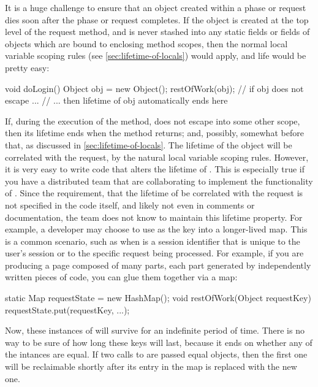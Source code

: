 It is a huge challenge to ensure that an object created within a phase or request
dies soon after the phase or request completes. If the object is created at the
top level of the request method, and is never stashed into any static fields or
fields of objects which are bound to enclosing method scopes, then the normal
local variable scoping rules (see \autoref{sec:lifetime-of-locals}) would apply,
and life would be pretty easy:
\begin{shortlisting}
void doLogin() {
   Object obj = new Object();
   restOfWork(obj); // if obj does not escape ...
} // ... then lifetime of obj automatically ends here
\end{shortlisting}
If, during the execution of the  method,   does not
escape into some other scope, then its lifetime ends when the 
method returns; and, possibly, somewhat before that, as discussed in
\autoref{sec:lifetime-of-locals}. The lifetime of the
object  will be correlated with the  request, by the
natural local variable scoping rules. However, it is very easy to write code that
alters the lifetime of . This is especially true if you have a
distributed team that are collaborating to implement the functionality of
. Since the requirement, that the lifetime of  be
correlated with the  request is not specified in the code itself,
and likely not even in comments or documentation, the team does not know to
maintain this lifetime property. For example, a developer may choose to use
 as the key into a longer-lived map. This is a common scenario, such
as when  is a session identifier that is unique to the user's session
or to the specific request being processed. For example, if you are producing a
page composed of many parts, each part generated by independently written pieces
of code, you can glue them together via a  map:
\begin{shortlisting}
static Map requestState = new HashMap();
void restOfWork(Object requestKey) {
   requestState.put(requestKey, ...);
}
\end{shortlisting}
Now, these instances of  will survive for an indefinite period of
time. There is no way to be sure of how long these keys will last, because it
ends on whether any of the  intances are equal. If two calls to
 are passed equal objects, then the first one will be
reclaimable shortly after its entry in the map is replaced with the new one. 

